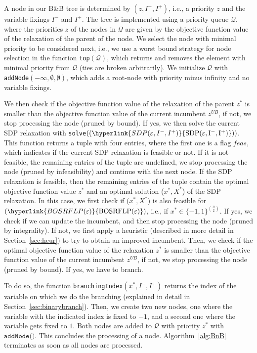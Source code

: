 \documentclass{article}
\newcommand{\myrefmath}[1]{(\hyperlink{#1}{\mathrm{#1}})}
\newcommand{\BB}{B\&B\xspace}
\begin{document}
A node in our \BB tree is determined by 
$(z,I^-,I^+)$, i.e., a priority $z$ and the variable fixings $I^-$ and $I^+$. The tree is implemented using a priority queue $\mathcal Q$, where the priorities $z$ of the nodes in $\mathcal Q$ are given by the objective function value of the relaxation of the parent of the node. We select the node with minimal priority to be considered next, i.e., we use a worst bound strategy for node selection in the function \texttt{top}$(\mathcal Q)$, which returns and removes the element with minimal priority from $\mathcal Q$ (ties are broken arbitrarily).
We initialize $\mathcal Q$ with \texttt{addNode}$(-\infty, \emptyset,\emptyset)$, which adds a root-node with priority minus infinity and no variable fixings.

We then check if the objective function value of the relaxation of the parent $z^*$ is smaller than the objective function value of the current incumbent $z^{UB}$, if not, we stop processing the node (pruned by bound). If yes, we then solve the current SDP relaxation with \texttt{solve}$(\myrefmath{SDP(\varepsilon,I^-,I^+)})$. This function returns a tuple with four entries, where the first one is a flag $feas$, which indicates if the current SDP relaxation is feasible or not. 
If it is not feasible, the remaining entries of the tuple are undefined, we stop processing the node (pruned by infeasibility) and continue with the next node. 
If the SDP relaxation is feasible, then the remaining entries of the tuple contain the optimal objective function value $z^*$ and an optimal solution ($x^*,X^*$) of the SDP relaxation. In this case, we first check if ($x^*,X^*$) is also feasible for $\myrefmath{BOSRFLP(\varepsilon)}$, i.e., if $x^* \in \{-1,1\}^{\binom{n}{2}}$. If yes, we check if we can update the incumbent, and then stop processing the node (pruned by integrality). If not, we first apply a heuristic (described in more detail in Section~\ref{sec:heur}) to try to obtain an improved incumbent. Then, we check if the optimal objective function value of the relaxation $z^*$ is smaller than the objective function value of the current incumbent $z^{UB}$, if not, we stop processing the node (pruned by bound). If yes, we have to branch. 

To do so, the function \texttt{branchingIndex}$(x^*,I^-,I^+)$ returns the index of the variable on which we do the branching (explained in detail in Section~\ref{sec:binarybranch}). 
Then, we create two new nodes, one where the variable with the indicated index is fixed to $-1$, and a second one where the variable gets fixed to $1$. Both nodes are added to $\mathcal Q$ with priority $z^*$ with $\texttt{addNode()}$. This concludes the processing of a node. Algorithm~\ref{alg:BnB} terminates as soon as all nodes are processed.
\end{document}
